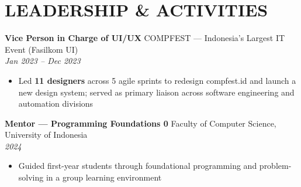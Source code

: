 \documentclass[10pt,a4paper]{article}
\newcommand{\experienceheader}[4]{
    \textbf{#1} \hfill #2 \\
    \textit{#3} \hfill \textit{#4}
}
\begin{document}
\vspace{-4pt}

\section*{LEADERSHIP \& ACTIVITIES}

\experienceheader{Vice Person in Charge of UI/UX}{COMPFEST — Indonesia's Largest IT Event (Fasilkom UI)}{}{Jan 2023 -- Dec 2023}
\begin{itemize}[leftmargin=*, itemsep=0.5pt, topsep=1pt]
    \item Led \textbf{11 designers} across 5 agile sprints to redesign compfest.id and launch a new design system; served as primary liaison across software engineering and automation divisions
\end{itemize}

\vspace{2pt}

\experienceheader{Mentor — Programming Foundations 0}{Faculty of Computer Science, University of Indonesia}{}{2024}
\begin{itemize}[leftmargin=*, itemsep=0.5pt, topsep=1pt]
    \item Guided first-year students through foundational programming and problem-solving in a group learning environment
\end{itemize}
\end{document}
